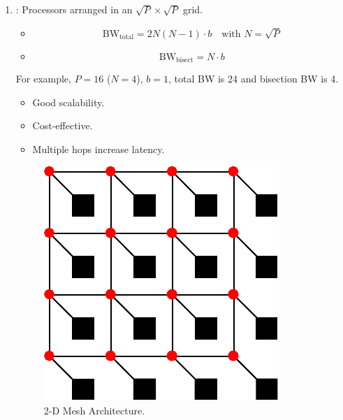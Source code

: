 \begin{enumerate}
    \item {}: Processors arranged in an $\sqrt{P} \times \sqrt{P}$ grid.
    \begin{itemize}
        \item {}
        \begin{equation}
            \text{BW}_{\text{total}} = 2N(N-1) \cdot b \quad \text{with } N=\sqrt{P}
        \end{equation}
        \item {}
        \begin{equation}
            \text{BW}_{\text{bisect}} = N \cdot b
        \end{equation}
    \end{itemize}
    For example, $P = 16$ ($N =4$), $b = 1$, total BW is 24 and bisection BW is 4.
    \begin{itemize}
        \item[\textcolor{Green3}{\faIcon{check}}] Good scalability.
        \item[\textcolor{Green3}{\faIcon{check}}] Cost-effective.
        \item[\textcolor{Red2}{\faIcon{times}}] Multiple hops increase latency.
    \end{itemize}
    \newpage
    \begin{figure}[!htp]
        \centering
        \includegraphics[width=.3\textwidth]{img/2d-mesh.pdf}
        \caption{2-D Mesh Architecture.\cite{course-slides-polimi}}
    \end{figure}
    

\end{enumerate}
